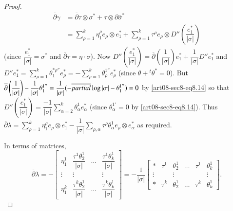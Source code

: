 \begin{proof}
\begin{align*}
\overline{\partial}\gamma &= \overline{\partial}\tau \otimes \sigma^{*}+\tau\otimes \partial \overline{\sigma}^{*}\\
&= \sum\limits^{k}_{\rho=1}\eta^{\rho}_{1}e_{\rho}\otimes e^{*}_{1}+\sum\limits^{k}_{\rho=1}\tau^{\rho}e_{\rho}\otimes D''\left(\dfrac{e^{*}_{1}}{|\sigma|}\right)
\end{align*}
(since $\dfrac{e^{*}_{1}}{|\sigma|}=\sigma^{*}$ and $\overline{\partial}\tau=\eta\cdot \sigma$). Now $D''\left(\dfrac{e^{*}_{1}}{|\sigma|}\right)=\overline{\partial}\left(\dfrac{1}{|\sigma|}\right)e^{*}_{1}+\dfrac{1}{|\sigma|}D''e^{*}_{1}$ and $D''e^{*}_{1}=\sum\limits^{k}_{\rho=1}\theta^{*\rho''}_{1}e^{*}_{\rho}=-\sum\limits^{k}_{\rho=1}\theta^{1''}_{\rho}e^{*}_{\rho}$ (since $\theta+{}^{t}\theta^{*}=0$). But $\overline{\partial}\left(\dfrac{1}{|\sigma|}\right)-\dfrac{1}{|\sigma|}\theta^{1''}_{1}=\dfrac{1}{|\sigma|}(-\overline{\\partial}\log |\sigma|-\theta^{1''}_{1})=0$ by \eqref{art08-sec8-eq8.14} so that $D''\left(\dfrac{e^{*}_{1}}{|\sigma|}\right)=\dfrac{-1}{|\sigma|}\sum\limits^{k}_{\alpha=2}\theta^{1}_{\alpha}e^{*}_{\alpha}$ (since $\theta^{1'}_{\alpha}=0$ by \eqref{art08-sec8-eq8.14}). Thus $\overline{\partial}\lambda=\sum\limits^{k}_{\rho=1}\eta^{\rho}_{1}e_{\rho}\otimes e^{*}_{1}-\dfrac{1}{|\sigma|}\sum\limits_{\rho,\alpha}\tau^{\rho}\theta^{1}_{\alpha}e_{\rho}\otimes e^{*}_{\alpha}$ as required.

In terms of matrices,
\begin{equation}
\overline{\partial}\lambda=-
\begin{bmatrix}
\eta^{1}_{1} & \dfrac{\tau^{1}\theta^{1}_{2}}{|\sigma|} & \ldots & \dfrac{\tau^{1}\theta^{1}_{k}}{|\sigma|}\\
\vdots & \vdots & & \vdots\\
\eta^{k}_{1} & \dfrac{\tau^{k}\theta^{1}_{2}}{|\sigma|} & \ldots & \dfrac{\tau^{k}\theta^{1}_{k}}{|\sigma|}
\end{bmatrix}
=-\dfrac{1}{|\sigma|}
\begin{bmatrix}
* & \tau^{1} & \theta^{1}_{2} & \ldots & \tau^{1} & \theta^{1}_{k}\\
\vdots & & \vdots & & & \vdots\\
* & \tau^{k} & \theta^{1}_{2} & \ldots & \tau^{k} & \theta^{1}_{k}
\end{bmatrix}.\label{art08-sec8-eq8.21}
\end{equation}
\end{proof}

